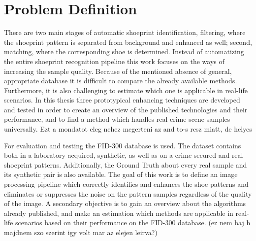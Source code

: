 \documentclass[draft,final]{vutinfth} %
\begin{document}
\section{Problem Definition}
\par
There are two main stages of automatic shoeprint identification, filtering, where the shoeprint pattern is separated from background and enhanced as well; second, matching, where the corresponding shoe is determined.
Instead of automatizing the entire shoeprint recognition pipeline this work focuses on the ways of increasing the sample quality.
Because of the mentioned absence of general, appropriate database it is difficult to compare the already available methods.
Furthermore, it is also challenging to estimate which one is applicable in real-life scenarios.
In this thesis three prototypical enhancing techniques are developed and tested in order to create an overview of the published technologies and their performance, and to find a method which handles real crime scene samples universally. Ezt a mondatot eleg nehez megerteni az and to-s resz miatt, de helyes
\par
For evaluation and testing the FID-300 database is used.
The dataset contains both in a laboratory acquired, synthetic, as well as on a crime secured and real shoeprint patterns.
Additionally, the Ground Truth about every real sample and its synthetic pair is also available.
The goal of this work is to define an image processing pipeline which correctly identifies and enhances the shoe patterns and eliminates or suppresses the noise on the pattern samples regardless of the quality of the image.
A secondary objective is to gain an overview about the algorithms already published, and make an estimation which methods are applicable in real-life scenarios based on their performance on the FID-300 database. (ez nem baj h majdnem szo szerint igy volt mar az elejen leirva?)
\end{document}
